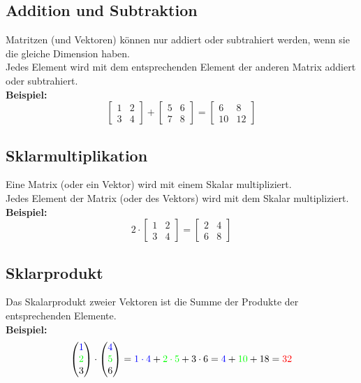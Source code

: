 \documentclass[12pt,a4paper]{article}
\begin{document}
\subsection{Addition und Subtraktion}
Matritzen (und Vektoren) können nur addiert oder subtrahiert werden, wenn sie die gleiche Dimension haben. \\
Jedes Element wird mit dem entsprechenden Element der anderen Matrix addiert oder subtrahiert. \\
\textbf{Beispiel:}
\[
\begin{bmatrix}
1 & 2 \\
3 & 4
\end{bmatrix}
+
\begin{bmatrix}
5 & 6 \\
7 & 8
\end{bmatrix}
=
\begin{bmatrix}
6 & 8 \\
10 & 12
\end{bmatrix}
\]

\subsection{Sklarmultiplikation}
Eine Matrix (oder ein Vektor) wird mit einem Skalar multipliziert. \\
Jedes Element der Matrix (oder des Vektors) wird mit dem Skalar multipliziert. \\
\textbf{Beispiel:}
\[
2 \cdot
\begin{bmatrix}
1 & 2 \\
3 & 4
\end{bmatrix}
=
\begin{bmatrix}
2 & 4 \\
6 & 8
\end{bmatrix}
\]

\subsection{Sklarprodukt}
Das Skalarprodukt zweier Vektoren ist die Summe der Produkte der entsprechenden Elemente. \\
\textbf{Beispiel:}
\[
\begin{pmatrix}
\textcolor{blue}{1} \\
\textcolor{green}{2} \\
3
\end{pmatrix}
\cdot
\begin{pmatrix}
\textcolor{blue}{4} \\
\textcolor{green}{5} \\
6
\end{pmatrix}
=
\textcolor{blue}{1 \cdot 4} + \textcolor{green}{2 \cdot 5} + 3 \cdot 6
=
\textcolor{blue}{4} + \textcolor{green}{10} + 18
=
\textcolor{red}{32}
\]
\end{document}
